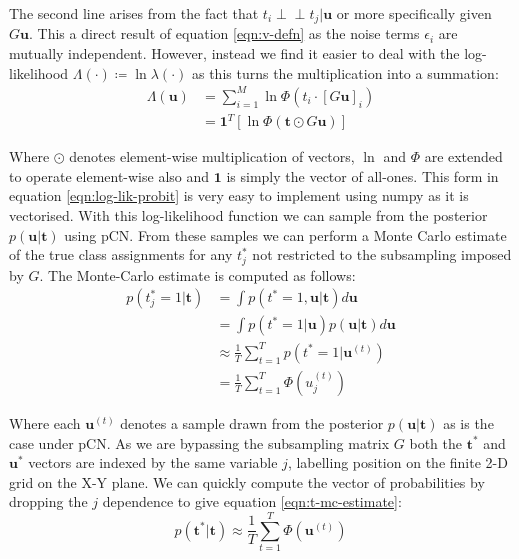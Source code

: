 \documentclass[]{article}
\newcommand{\lik}{\lambda}
\newcommand{\loglik}{\Lambda}
\newcommand{\indep}{\perp \!\!\! \perp}
\newcommand{\tbold}{\boldsymbol{t}}
\newcommand{\ubold}{\boldsymbol{u}}
\begin{document}
The second line arises from the fact that $t_i \indep t_j | \ubold$ or more specifically given $G\ubold$. This a direct result of equation \ref{eqn:v-defn} as the noise terms $\epsilon_i$ are mutually independent. However, instead we find it easier to deal with the log-likelihood $\loglik(\cdot) \coloneqq \ln \lik(\cdot)$ as this turns the multiplication into a summation:
%
\begin{align}
	\loglik(\ubold) &= \sum_{i=1}^{M} \ln \Phi(t_i \cdot [G\ubold]_i) \nonumber \\
	&= \mathbf{1}^T \left[ \ln \Phi(\tbold \odot G\ubold) \right]
	\label{eqn:log-lik-probit}
\end{align}

Where $\odot$ denotes element-wise multiplication of vectors, $\ln$ and $\Phi$ are extended to operate element-wise also and $\mathbf{1}$ is simply the vector of all-ones. This form in equation \ref{eqn:log-lik-probit} is very easy to implement using numpy as it is vectorised. With this log-likelihood function we can sample from the posterior $p(\ubold | \tbold)$ using pCN. From these samples we can perform a Monte Carlo estimate of the true class assignments for any $t^*_j$ not restricted to the subsampling imposed by $G$. The Monte-Carlo estimate is computed as follows:
%
\begin{align}
	p(t^*_j = 1 | \tbold) &= \int p(t^* = 1, \ubold | \tbold) d\ubold \nonumber \\
	&= \int p(t^* = 1 | \ubold) p(\ubold | \tbold) d\ubold \nonumber \\
	&\approx \frac{1}{T} \sum_{t=1}^{T} p \left( t^* = 1 | \ubold^{(t)} \right) \nonumber \\
	&= \frac{1}{T} \sum_{t=1}^{T} \Phi \left( u^{(t)}_j \right)
\end{align}

Where each $\ubold^{(t)}$ denotes a sample drawn from the posterior $p(\ubold | \tbold)$ as is the case under pCN. As we are bypassing the subsampling matrix $G$ both the $\tbold^*$ and $\ubold^*$ vectors are indexed by the same variable $j$, labelling position on the finite 2-D grid on the X-Y plane. We can quickly compute the vector of probabilities by dropping the $j$ dependence to give equation \ref{eqn:t-mc-estimate}:
%
\begin{equation}
	p(\tbold^* | \tbold) \approx \frac{1}{T} \sum_{t=1}^{T} \Phi \left( \ubold^{(t)} \right)
	\label{eqn:t-mc-estimate}
\end{equation}
\end{document}
